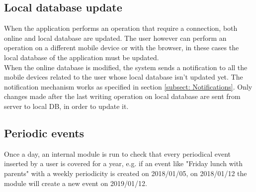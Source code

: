 \subsection{Local database update}
When the application performs an operation that require a connection, both online and local database are updated. The user however can perform an operation on a different mobile device or with the browser, in these cases the local database of the application must be updated.\\
When the online database is modified, the system sends a notification to all the mobile devices related to the user whose local database isn't updated yet. The notification mechanism works as specified in section \ref{subsect: Notifications}. Only changes made after the last writing operation on local database are sent from server to local DB, in order to update it.

\subsection{Periodic events}
Once a day, an internal module is run to check that every periodical event inserted by a user is covered for a year, e.g. if an event like "Friday lunch with parents" with a weekly periodicity is created on 2018/01/05, on 2018/01/12 the module will create a new event on 2019/01/12.
